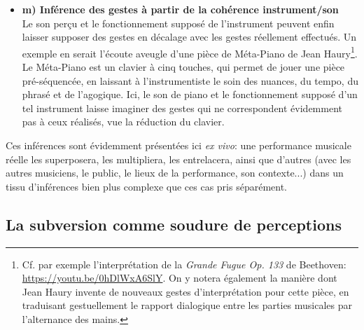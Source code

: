 \begin{itemize}[noitemsep]
	\item \textbf{m) Inférence des gestes à partir de la cohérence instrument/son}\\
	Le son perçu et le fonctionnement supposé de l'instrument peuvent enfin laisser supposer des gestes en décalage avec les gestes réellement effectués. Un exemple en serait l'écoute aveugle d'une pièce de Méta-Piano de Jean Haury\footnote{Cf. par exemple l'interprétation de la \textit{Grande Fugue Op. 133} de Beethoven: \url{https://youtu.be/0hDlWxA6SlY}. On y notera également la manière dont Jean Haury invente de nouveaux gestes d'interprétation pour cette pièce, en traduisant gestuellement le rapport dialogique entre les parties musicales par l'alternance des mains.}.  Le Méta-Piano est un clavier à cinq touches, qui permet de jouer une pièce pré-séquencée, en laissant à l'instrumentiste le soin des nuances, du tempo, du phrasé et de l'agogique.  Ici, le son de piano et le fonctionnement supposé d'un tel instrument laisse imaginer des gestes qui ne correspondent évidemment pas à ceux réalisés, vue la réduction du clavier.
\end{itemize}

\noindent Ces inférences sont évidemment présentées ici \textit{ex vivo}: une performance musicale réelle les superposera, les multipliera, les entrelacera, ainsi que d'autres (avec les autres musiciens, le public, le lieux de la performance, son contexte...) dans un tissu d'inférences bien plus complexe que ces cas pris séparément.



\subsection{La subversion comme soudure de perceptions}

